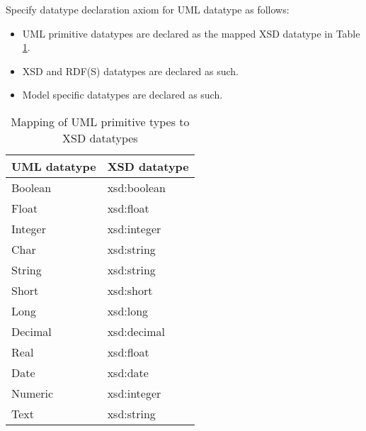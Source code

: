 \begin{trule}
	\label{rule:datatype-core}
	Specify datatype declaration axiom for UML datatype as follows:
	\begin{itemize}
		\item UML primitive datatypes are declared as the mapped XSD datatype in Table \ref{tab:type-mapping}.
		\item XSD and RDF(S) datatypes are declared as such.
		\item Model specific datatypes are declared as such.
	\end{itemize}
\end{trule}

\begin{table}[!ht]
\centering
\begin{tabular}{@{}ll@{}}
\toprule
UML datatype & XSD datatype \\ \midrule
Boolean & xsd:boolean \\
Float & xsd:float \\
Integer & xsd:integer \\
Char & xsd:string \\
String & xsd:string \\
Short & xsd:short \\
Long & xsd:long \\
Decimal & xsd:decimal \\
Real & xsd:float \\
Date & xsd:date \\
Numeric & xsd:integer \\
Text & xsd:string \\ \bottomrule
\end{tabular}
\caption{Mapping of UML primitive types to XSD datatypes}
\label{tab:type-mapping}
\end{table}

